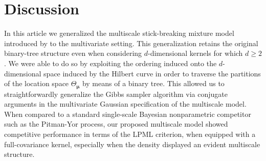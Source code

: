 \documentclass[nonatbib]{elsarticle}
\begin{document}




\section{Discussion}\label{sec:discussion}
In this article we generalized the multiscale stick-breaking mixture model introduced by \textcite{stefanucci2021} to the multivariate setting.
This generalization retains the original binary-tree structure even when considering $d$-dimensional kernels for which $d \ge  2$.
We were able to do so by exploiting the ordering induced onto the $d$-dimensional space induced by the Hilbert curve in order to traverse the partitions of the location space $\Theta_{\bm{\mu}}$ by means of a binary tree.
This allowed us to straightforwardly generalize the Gibbs sampler algorithm via conjugate arguments in the multivariate Gaussian specification of the multiscale model.
When compared to a standard single-scale Bayesian nonparametric competitor such as the Pitman-Yor process, our proposed multiscale model showed competitive performance in terms of the LPML criterion, when equipped with a full-covariance kernel, especially when the density displayed an evident multiscale structure.

\printbibliography
\end{document}
